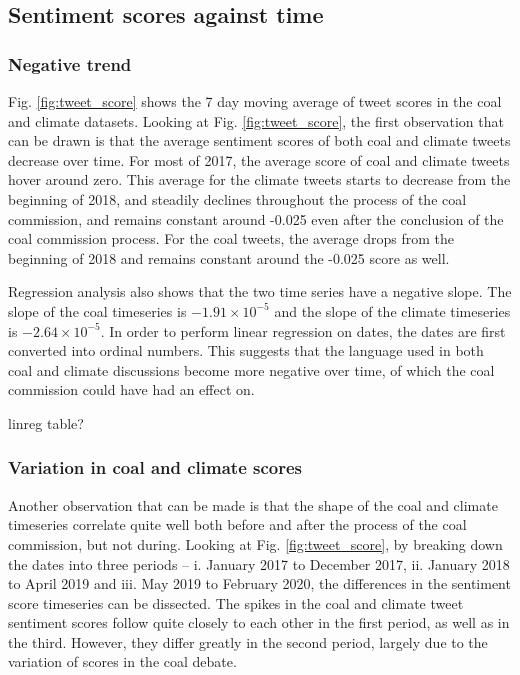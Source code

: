 \documentclass[12pt,onecolumn,twoside]{layout}
\begin{document}
\subsection*{Sentiment scores against time} 
\subsubsection*{Negative trend} %
Fig. \ref{fig:tweet_score} shows the 7 day moving average of tweet scores in the coal and climate datasets. Looking at Fig. \ref{fig:tweet_score}, the first observation that can be drawn is that the average sentiment scores of both coal and climate tweets decrease over time. For most of 2017, the average score of coal and climate tweets hover around zero. This average for the climate tweets starts to decrease from the beginning of 2018, and steadily declines throughout the process of the coal commission, and remains constant around -0.025 even after the conclusion of the coal commission process. For the coal tweets, the average drops from the beginning of 2018 and remains constant around the -0.025 score as well. 

Regression analysis also shows that the two time series have a negative slope. The slope of the coal timeseries is $-1.91 \times 10^{-5}$ and the slope of the climate timeseries is $-2.64 \times 10^{-5}$. In order to perform linear regression on dates, the dates are first converted into ordinal numbers. This suggests that the language used in both coal and climate discussions become more negative over time, of which the coal commission could have had an effect on. 

{\color{red}linreg table?}

\subsubsection*{Variation in coal and climate scores} %
Another observation that can be made is that the shape of the coal and climate timeseries correlate quite well both before and after the process of the coal commission, but not during. Looking at Fig. \ref{fig:tweet_score}, by breaking down the dates into three periods -- i. January 2017 to December 2017, ii. January 2018 to April 2019 and iii. May 2019 to February 2020, the differences in the sentiment score timeseries can be dissected. The spikes in the coal and climate tweet sentiment scores follow quite closely to each other in the first period, as well as in the third. However, they differ greatly in the second period, largely due to the variation of scores in the coal debate. 
\end{document}
